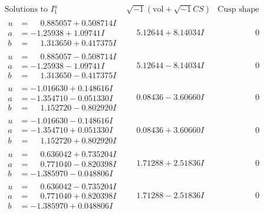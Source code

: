 \documentclass[1p]{elsarticle_modified}
\theoremstyle{definition}
\newcommand{\I}{\sqrt{-1}}
\begin{document}
$$\begin{array}{c|c|c}  
\text{Solutions to }I^u_{1}& \I (\text{vol} + \sqrt{-1}CS) & \text{Cusp shape}\\
 \hline 
\begin{aligned}
u &= \phantom{-}0.885057 + 0.508714 I \\
a &= -1.25938 + 1.09741 I \\
b &= \phantom{-}1.313650 + 0.417375 I\end{aligned}
 & \phantom{-}5.12644 + 8.14034 I & \phantom{-0.000000 } 0 \\ \hline\begin{aligned}
u &= \phantom{-}0.885057 - 0.508714 I \\
a &= -1.25938 - 1.09741 I \\
b &= \phantom{-}1.313650 - 0.417375 I\end{aligned}
 & \phantom{-}5.12644 - 8.14034 I & \phantom{-0.000000 } 0 \\ \hline\begin{aligned}
u &= -1.016630 + 0.148616 I \\
a &= -1.354710 - 0.051330 I \\
b &= \phantom{-}1.152720 - 0.802920 I\end{aligned}
 & \phantom{-}0.08436 - 3.60660 I & \phantom{-0.000000 } 0 \\ \hline\begin{aligned}
u &= -1.016630 - 0.148616 I \\
a &= -1.354710 + 0.051330 I \\
b &= \phantom{-}1.152720 + 0.802920 I\end{aligned}
 & \phantom{-}0.08436 + 3.60660 I & \phantom{-0.000000 } 0 \\ \hline\begin{aligned}
u &= \phantom{-}0.636042 + 0.735204 I \\
a &= \phantom{-}0.771040 - 0.820398 I \\
b &= -1.385970 - 0.048806 I\end{aligned}
 & \phantom{-}1.71288 + 2.51836 I & \phantom{-0.000000 } 0 \\ \hline\begin{aligned}
u &= \phantom{-}0.636042 - 0.735204 I \\
a &= \phantom{-}0.771040 + 0.820398 I \\
b &= -1.385970 + 0.048806 I\end{aligned}
 & \phantom{-}1.71288 - 2.51836 I & \phantom{-0.000000 } 0 \\ \hline\begin{aligned}

\end{aligned}
\end{array}$$
\end{document}
